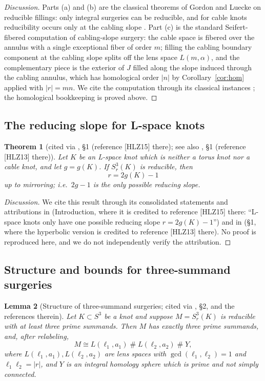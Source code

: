 \documentclass[11pt]{amsart}
\newtheorem{theorem}{Theorem}[section]
\newtheorem{lemma}[theorem]{Lemma}
\theoremstyle{definition}
\theoremstyle{remark}
\numberwithin{equation}{section}
\begin{document}
\begin{proof}[Discussion]
Parts (a) and (b) are the classical theorems of Gordon and Luecke on
reducible fillings: only integral surgeries can be reducible, and for
cable knots reducibility occurs only at the cabling slope
\cite{GL1,GL2}. Part (c) is the standard Seifert-fibered computation of
cabling-slope surgery: the cable space is fibered over the annulus with a
single exceptional fiber of order $m$; filling the cabling boundary
component at the cabling slope splits off the lens space $L(m,\alpha)$,
and the complementary piece is the exterior of $J$ filled along the
slope induced through the cabling annulus, which has homological order
$|n|$ by Corollary~\ref{cor:hom} applied with $|r|=mn$. We cite the
computation through its classical instances \cite{Moser,GL2}; the
homological bookkeeping is proved above.
\end{proof}

\subsection{The reducing slope for L-space knots}

\begin{theorem}[{cited via \cite{ORS}, \S1 (reference [HLZ15] there); see
also \cite{GW}, \S1 (reference [HLZ13] there)}]\label{thm:HLZ}
Let $K$ be an L-space knot which is neither a torus knot nor a cable
knot, and let $g=g(K)$. If $S^{3}_{r}(K)$ is reducible, then
\[
r=2g(K)-1
\]
up to mirroring; i.e.\ $2g-1$ is the only possible reducing slope.
\end{theorem}

\begin{proof}[Discussion]
We cite this result through its consolidated statements and attributions
in \cite{ORS} (Introduction, where it is credited to reference [HLZ15]
there: ``L-space knots only have one possible reducing slope
$r=2g(K)-1$'') and in \cite{GW} (\S1, where the hyperbolic version is
credited to reference [HLZ13] there). No proof is reproduced here, and we
do not independently verify the attribution.
\end{proof}

\subsection{Structure and bounds for three-summand surgeries}

\begin{lemma}[Structure of three-summand surgeries; {cited via
\cite{Howie}, \S2, and the references therein}]\label{lem:struct}
Let $K\subset S^{3}$ be a knot and suppose $M=S^{3}_{r}(K)$ is reducible
with at least three prime summands. Then $M$ has exactly three prime
summands, and, after relabeling,
\[
M\cong L(\ell_{1},a_{1})\;\#\;L(\ell_{2},a_{2})\;\#\;Y,
\]
where $L(\ell_{1},a_{1}),L(\ell_{2},a_{2})$ are lens spaces with
$\gcd(\ell_{1},\ell_{2})=1$ and $\ell_{1}\ell_{2}=|r|$, and $Y$ is an
integral homology sphere which is prime and not simply connected.
\end{lemma}
\end{document}
